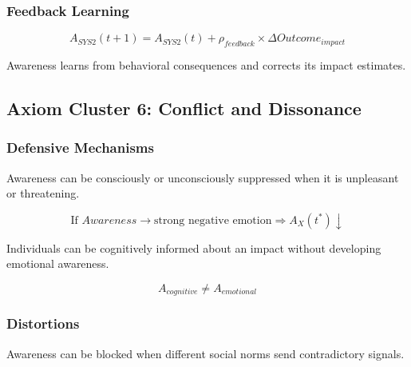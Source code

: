 \subsubsection{Feedback Learning}

\begin{equation}
A_{SYS2}(t+1) = A_{SYS2}(t) + \rho_{feedback} \times \Delta Outcome_{impact}
\end{equation}

Awareness learns from behavioral consequences and corrects its impact estimates.

\subsection{Axiom Cluster 6: Conflict and Dissonance}
\label{subsec:axioms-conflict}

\subsubsection{Defensive Mechanisms}

\begin{axiom}
\label{ax:awx-a66}
Awareness can be consciously or unconsciously suppressed when it is 
unpleasant or threatening.
\end{axiom}

\begin{equation}
\text{If } Awareness \rightarrow \text{strong negative emotion} \Rightarrow A_X(t^*) \downarrow
\end{equation}

\begin{axiom}
\label{ax:awx-a67}
Individuals can be cognitively informed about an impact without 
developing emotional awareness.
\end{axiom}

\begin{equation}
A_{cognitive} \neq A_{emotional}
\end{equation}

\subsubsection{Distortions}

\begin{axiom}
\label{ax:awx-a68}
Awareness can be blocked when different social norms send contradictory signals.
\end{axiom}

